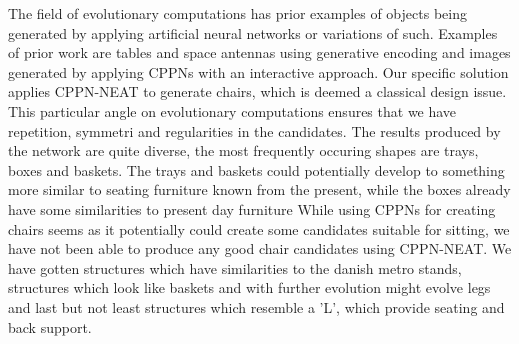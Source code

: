 The field of evolutionary computations has prior examples of objects being
generated by applying artificial neural networks or variations of such.
Examples of prior work are tables and space antennas using generative encoding
and images generated by applying CPPNs with an interactive approach. Our
specific solution applies CPPN-NEAT to generate chairs, which is deemed a
classical design issue. This particular angle on evolutionary computations
ensures that we have repetition, symmetri and regularities in the candidates.
The results produced by the network are quite diverse, the most frequently
occuring shapes are trays, boxes and baskets. The trays and baskets could
potentially develop to something more similar to seating furniture known from
the present, while the boxes already have some similarities to present day
furniture While using CPPNs for creating chairs seems as it potentially could
create some candidates suitable for sitting, we have not been able to produce
any good chair candidates using CPPN-NEAT. We have gotten structures which have
similarities to the danish metro stands, structures which look like baskets and
with further evolution might evolve legs and last but not least structures
which resemble a 'L', which provide seating and back support.
